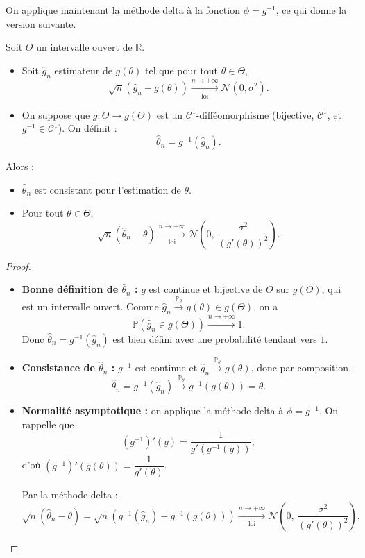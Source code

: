 \smallskip

On applique maintenant la méthode delta à la fonction $\phi = g^{-1}$, ce qui donne la version suivante.

\begin{mdframed}
\begin{proposition}
Soit $\Theta$ un intervalle ouvert de $\mathbb{R}$.
\begin{itemize}
    \item Soit $\hat{g}_n$ estimateur de $g(\theta)$ tel que pour tout $\theta \in \Theta$,
    \[
    \sqrt{n}\left(\hat{g}_n - g(\theta)\right) \xrightarrow[\text{loi}]{n \to +\infty} \mathcal{N}(0, \sigma^2).
    \]
    \item On suppose que $g : \Theta \to g(\Theta)$ est un $\mathcal{C}^1$-difféomorphisme (bijective, $\mathcal{C}^1$, et $g^{-1} \in \mathcal{C}^1$). On définit :
    \[
    \hat{\theta}_n = g^{-1}(\hat{g}_n).
    \]
\end{itemize}
Alors :
\begin{itemize}
    \item $\hat{\theta}_n$ est consistant pour l'estimation de $\theta$.
    \item Pour tout $\theta \in \Theta$,
    \[
    \sqrt{n}\left(\hat{\theta}_n - \theta\right) \xrightarrow[\text{loi}]{n \to +\infty} \mathcal{N}\!\left(0,\, \frac{\sigma^2}{(g'(\theta))^2}\right).
    \]
\end{itemize}
\end{proposition}
\end{mdframed}

\begin{proof}
\begin{itemize}
    \item \textbf{Bonne définition de $\hat{\theta}_n$ :} $g$ est continue et bijective de $\Theta$ sur $g(\Theta)$, qui est un intervalle ouvert. Comme $\hat{g}_n \xrightarrow{\mathbb{P}_\theta} g(\theta) \in g(\Theta)$, on a
    \[
    \mathbb{P}\!\left(\hat{g}_n \in g(\Theta)\right) \xrightarrow{n \to +\infty} 1.
    \]
    Donc $\hat{\theta}_n = g^{-1}(\hat{g}_n)$ est bien défini avec une probabilité tendant vers $1$.

    \item \textbf{Consistance de $\hat{\theta}_n$ :} $g^{-1}$ est continue et $\hat{g}_n \xrightarrow{\mathbb{P}_\theta} g(\theta)$, donc par composition,
    \[
    \hat{\theta}_n = g^{-1}(\hat{g}_n) \xrightarrow{\mathbb{P}_\theta} g^{-1}(g(\theta)) = \theta.
    \]

    \item \textbf{Normalité asymptotique :} on applique la méthode delta à $\phi = g^{-1}$. On rappelle que
    \[
    (g^{-1})'(y) = \frac{1}{g'(g^{-1}(y))},
    \]
    d'où $(g^{-1})'(g(\theta)) = \dfrac{1}{g'(\theta)}$.

    Par la méthode delta :
    \[
    \sqrt{n}\left(\hat{\theta}_n - \theta\right) = \sqrt{n}\left(g^{-1}(\hat{g}_n) - g^{-1}(g(\theta))\right) \xrightarrow[\text{loi}]{n \to +\infty} \mathcal{N}\!\left(0,\, \frac{\sigma^2}{(g'(\theta))^2}\right).
    \]
\end{itemize}
\end{proof}
